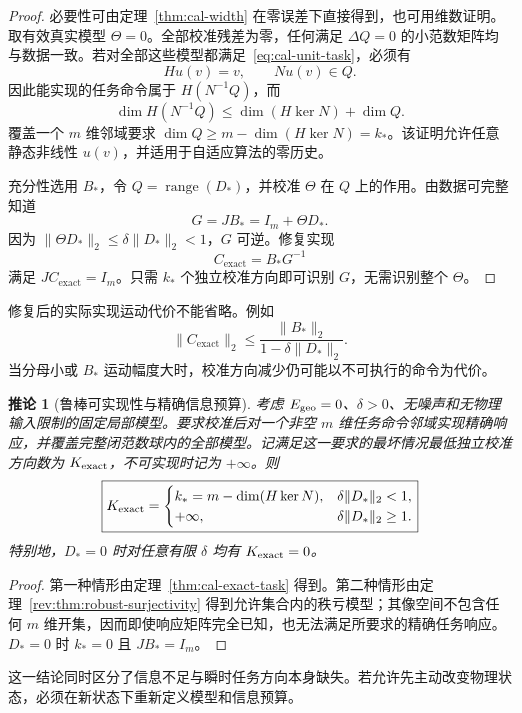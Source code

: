 \documentclass[11pt,a4paper]{article}
\numberwithin{equation}{section}
\newtheorem{corollary}[theorem]{推论}
\theoremstyle{definition}
\begin{document}
\begin{proof}
必要性可由定理~\ref{thm:cal-width} 在零误差下直接得到，也可用维数证明。取有效真实模型 $\Theta=0$。全部校准残差为零，任何满足 $\Delta Q=0$ 的小范数矩阵均与数据一致。若对全部这些模型都满足~\eqref{eq:cal-unit-task}，必须有
\begin{equation}
  Hu(v)=v,\qquad Nu(v)\in Q .
\end{equation}
因此能实现的任务命令属于 $H(N^{-1}Q)$，而
\begin{equation}
  \dim H(N^{-1}Q)
  \le\dim(H\ker N)+\dim Q .
\end{equation}
覆盖一个 $m$ 维邻域要求 $\dim Q\ge m-\dim(H\ker N)=k_*$。该证明允许任意静态非线性 $u(v)$，并适用于自适应算法的零历史。

充分性选用 $B_*$，令 $Q=\operatorname{range}(D_*)$，并校准 $\Theta$ 在 $Q$ 上的作用。由数据可完整知道
\begin{equation}
  G=JB_*=I_m+\Theta D_* .
\end{equation}
因为 $\|\Theta D_*\|_2\le\delta\|D_*\|_2<1$，$G$ 可逆。修复实现
\begin{equation}
  C_{\mathrm{exact}}=B_*G^{-1}
  \label{eq:cal-exact-repair}
\end{equation}
满足 $JC_{\mathrm{exact}}=I_m$。只需 $k_*$ 个独立校准方向即可识别 $G$，无需识别整个 $\Theta$。
\end{proof}

修复后的实际实现运动代价不能省略。例如
\begin{equation}
  \|C_{\mathrm{exact}}\|_2
  \le
  \frac{\|B_*\|_2}{1-\delta\|D_*\|_2}.
  \label{eq:cal-exact-command-bound}
\end{equation}
当分母小或 $B_*$ 运动幅度大时，校准方向减少仍可能以不可执行的命令为代价。

\begin{corollary}[鲁棒可实现性与精确信息预算]
\label{rev:cor:rank-information-link}
考虑 $E_{\rm geo}=0$、$\delta>0$、无噪声和无物理输入限制的固定局部模型。要求校准后对一个非空 $m$ 维任务命令邻域实现精确响应，并覆盖完整闭范数球内的全部模型。记满足这一要求的最坏情况最低独立校准方向数为 $K_{\rm exact}$，不可实现时记为 $+\infty$。则
\begin{equation}
 \boxed{
 K_{\rm exact}=
 \begin{cases}
 k_*=m-\dim(H\ker N),&\delta\|D_*\|_2<1,\\
 +\infty,&\delta\|D_*\|_2\ge1.
 \end{cases}}
 \label{rev:eq:rank-information-frontier}
\end{equation}
特别地，$D_*=0$ 时对任意有限 $\delta$ 均有 $K_{\rm exact}=0$。
\end{corollary}
\begin{proof}
第一种情形由定理~\ref{thm:cal-exact-task} 得到。第二种情形由定理~\ref{rev:thm:robust-surjectivity} 得到允许集合内的秩亏模型；其像空间不包含任何 $m$ 维开集，因而即使响应矩阵完全已知，也无法满足所要求的精确任务响应。$D_*=0$ 时 $k_*=0$ 且 $JB_*=I_m$。
\end{proof}
这一结论同时区分了信息不足与瞬时任务方向本身缺失。若允许先主动改变物理状态，必须在新状态下重新定义模型和信息预算。
\end{document}

